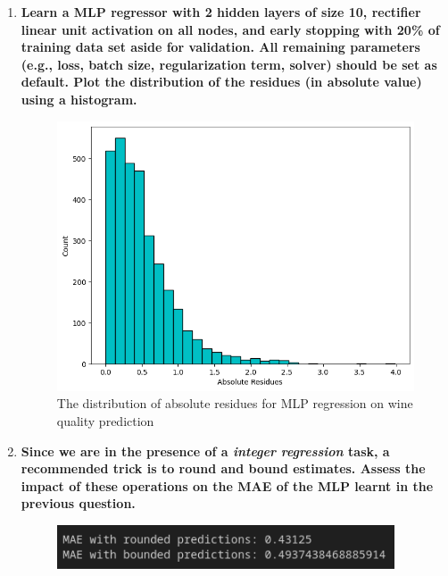 \documentclass[12pt]{article}
\begin{document}
\begin{enumerate}[leftmargin=\labelsep]
    \item \textbf{Learn a MLP regressor with 2 hidden layers of size 10, rectifier linear unit activation
          on all nodes, and early stopping with 20\% of training data set aside for validation. All
          remaining parameters (e.g., loss, batch size, regularization term, solver) should be set as
          default. Plot the distribution of the residues (in absolute value) using a histogram.}

          \vskip 0.3cm
          

          \begin{figure}[H]
              \centering
              \includegraphics[width=14cm]{./assets/residues_histogram_ex1_PartII.png}
              \caption{The distribution of absolute residues for MLP regression on wine quality prediction}
              \label{fig:PartII-ex1}
          \end{figure}

    \item \textbf{Since we are in the presence of a \textit{integer regression} task, a recommended trick is to
          round and bound estimates. Assess the impact of these operations on the MAE of the MLP learnt in the previous question.}

          \vskip 0.3cm
          
          \begin{figure}[H]
              \includegraphics[width=10cm]{./assets/mae_round_bound_ex2_PartII.png}
              \label{fig:PartII-ex2}
          \end{figure}


\end{enumerate}
\end{document}

